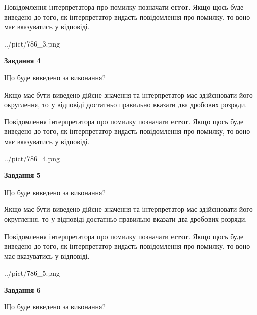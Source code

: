 \documentclass[12pt, ukrainian]{article}
\begin{document}
{\begin {Large}
Повідомлення інтерпретатора про помилку позначати \textbf{error}.
Якщо щось буде виведено до того, як інтерпретатор видасть повідомлення про помилку, 
то воно має вказуватись у відповіді. \par

\begin{center}
	{../pict/786_3.png}
\end{center}
\newpage

{\begin {center}\textbf{Завдання 4}\end {center}}\par
Що буде виведено за виконання? \par

Якщо має бути виведено дійсне значення та інтерпретатор має здійснювати його округлення, 
то у відповіді достатньо правильно вказати два дробових розряди.

Повідомлення інтерпретатора про помилку позначати \textbf{error}.
Якщо щось буде виведено до того, як інтерпретатор видасть повідомлення про помилку, 
то воно має вказуватись у відповіді. \par

\begin{center}
	{../pict/786_4.png}
\end{center}
\newpage

{\begin {center}\textbf{Завдання 5}\end {center}}\par
Що буде виведено за виконання? \par

Якщо має бути виведено дійсне значення та інтерпретатор має здійснювати його округлення, 
то у відповіді достатньо правильно вказати два дробових розряди.

Повідомлення інтерпретатора про помилку позначати \textbf{error}.
Якщо щось буде виведено до того, як інтерпретатор видасть повідомлення про помилку, 
то воно має вказуватись у відповіді. \par

\begin{center}
	{../pict/786_5.png}
\end{center}
\newpage

{\begin {center}\textbf{Завдання 6}\end {center}}\par
Що буде виведено за виконання? \par


\end{Large}}
\end{document}
